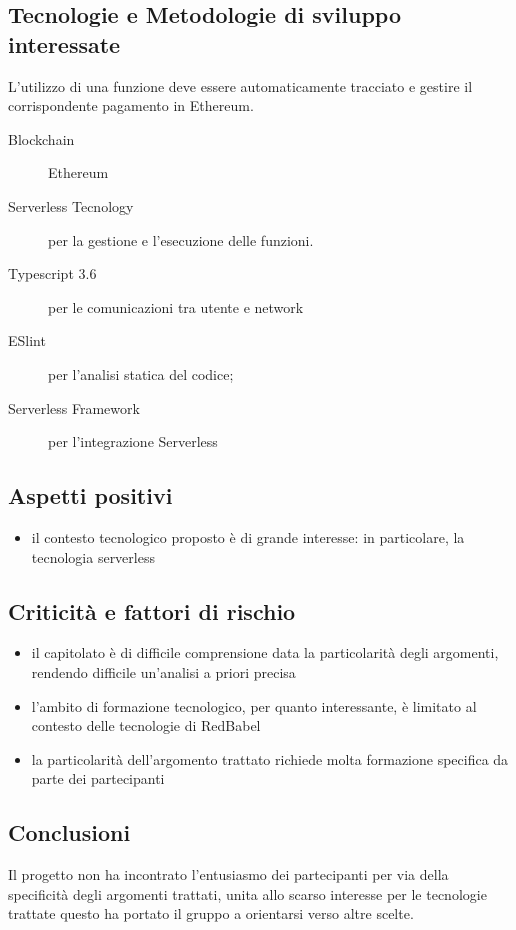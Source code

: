 \documentclass[../studio-di-fattibilita.tex]{subfiles}
\begin{document}
	\subsection{Tecnologie e Metodologie di sviluppo interessate}
	\label{sec:tecnologie_interessate}
    L'utilizzo di una funzione deve essere automaticamente tracciato e gestire il corrispondente pagamento in Ethereum.	
	\begin{description}
		\item[Blockchain] Ethereum
		\item[Serverless Tecnology] per la gestione e l'esecuzione delle funzioni.
		\item[Typescript 3.6] per le comunicazioni tra utente e network
		\item[ESlint] per l'analisi statica del codice;
		\item[Serverless Framework] per l'integrazione Serverless
	\end{description}
	\subsection{Aspetti positivi}
	\label{sec:aspetti_positivi}
	\begin{itemize}
		\item il contesto tecnologico proposto è di grande interesse: in particolare, la tecnologia serverless
	\end{itemize}
	\subsection{Criticità e fattori di rischio}
	\label{sec:criticità_e_fattori_di_rischio}
	\begin{itemize}
		\item il capitolato è di difficile comprensione data la particolarità degli argomenti, rendendo difficile un'analisi a priori precisa 
		\item l'ambito di formazione tecnologico, per quanto interessante, è limitato al contesto delle tecnologie di RedBabel
		\item la particolarità dell'argomento trattato richiede molta formazione specifica da parte dei partecipanti
	\end{itemize}
	\subsection{Conclusioni}
	\label{sec:conclusioni}
	Il progetto non ha incontrato l'entusiasmo dei partecipanti per via della specificità degli argomenti trattati, unita allo scarso interesse per le tecnologie trattate 
questo ha portato il gruppo a orientarsi verso altre scelte.
\end{document}
